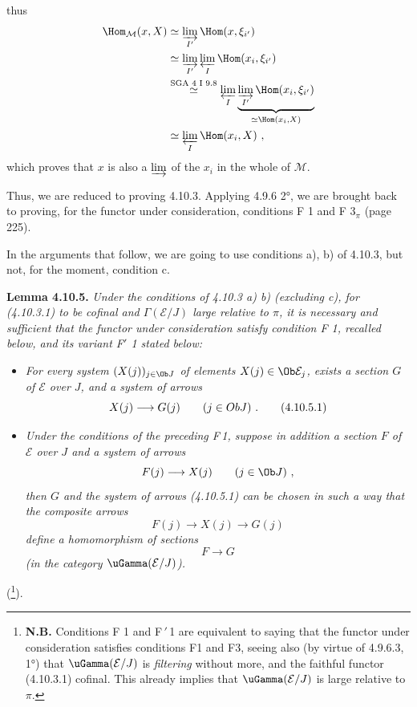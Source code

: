 thus
\[
\begin{aligned}
\Hom_{\mathcal{M}}(x,X) &\simeq \varinjlim_{I'} \Hom(x,\xi_{i'})\\
&\simeq \varinjlim_{I'} \varprojlim_{I} \Hom(x_i,\xi_{i'})\\
&\overset{\text{SGA 4 I 9.8}}{\simeq} \varprojlim_{I} \underbrace{\varinjlim_{I'} \Hom(x_i,\xi_{i'})}_{\simeq \Hom(x_i,X)}\\
&\simeq \varprojlim_{I} \Hom(x_i,X)\ ,
\end{aligned}
\]
which proves that $x$ is also a $\varinjlim$ of the $x_i$ in the whole of $\mathcal{M}$.

Thus, we are reduced to proving 4.10.3. Applying 4.9.6 2°, we are brought back to proving, for the functor under consideration, conditions F 1 and F $3_\pi$ (page 225).

In the arguments that follow, we are going to use conditions a), b) of 4.10.3, but not, for the moment, condition c.

\textbf{Lemma 4.10.5.} \textit{Under the conditions of 4.10.3 a) b) (excluding c), for (4.10.3.1) to be cofinal and $\Gamma(\mathcal{E}/J)$ large relative to $\pi$, it is necessary and sufficient that the functor under consideration satisfy condition F 1, recalled below, and its variant F$'$ 1 stated below:}
\begin{itemize}[leftmargin=3em]
\item[F\,1)] {\itshape For every system $(X(j))_{j\in\Ob J}$ of elements $X(j)\in\Ob\mathcal{E}_j$, exists a \textup{section} $G$ of $\mathcal{E}$ over $J$, and a system of arrows
\[
X(j) \longrightarrow G(j) \qquad (j\in ObJ)\ . \tag*{\textup{(4.10.5.1)}}
\]}
\item[F$'$1)] {\itshape Under the conditions of the preceding \textup{F\,1}, suppose in addition a section $F$ of $\mathcal{E}$ over $J$  and a system of arrows
\[
F(j) \longrightarrow X(j) \qquad (j\in\Ob J)\ ,
\]
then $G$ and the system of arrows (4.10.5.1) can be chosen in such a way that the composite arrows
\[
F(j) \longrightarrow X(j) \longrightarrow G(j)
\]
define a homomorphism of sections
\[
F \longrightarrow G
\]
(in the category $\uGamma(\mathcal{E}/J)$).}
\end{itemize}
(\footnote[106]{\textbf{N.B.} Conditions F 1 and F$\,'$\,1 are equivalent to saying that the functor under consideration satisfies conditions F1 and F3, seeing also (by virtue of 4.9.6.3, 1°) that $\uGamma(\mathcal{E}/J)$ is \textit{filtering} without more, and the faithful functor (4.10.3.1) cofinal. This already implies that $\uGamma(\mathcal{E}/J)$ is large relative to $\pi$.}).

